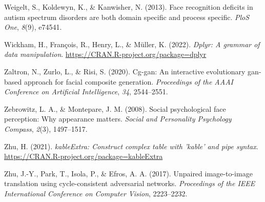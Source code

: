 \documentclass[
  doc,floatsintext]{apa6}
\newlength{\cslhangindent}
\newlength{\cslentryspacingunit} %
\newenvironment{CSLReferences}[2] %
 {%
  \setlength{\parindent}{0pt}
  \ifodd #1
  \let\oldpar\par
  \def\par{\hangindent=\cslhangindent\oldpar}
  \fi
  \setlength{\parskip}{#2\cslentryspacingunit}
 }%
 {}
\begin{document}
\begin{CSLReferences}{1}{0}
\leavevmode{}%
Weigelt, S., Koldewyn, K., \& Kanwisher, N. (2013). Face recognition deficits in autism spectrum disorders are both domain specific and process specific. \emph{PloS One}, \emph{8}(9), e74541.

\leavevmode{}%
Wickham, H., François, R., Henry, L., \& Müller, K. (2022). \emph{Dplyr: A grammar of data manipulation}. \url{https://CRAN.R-project.org/package=dplyr}

\leavevmode{}%
Zaltron, N., Zurlo, L., \& Risi, S. (2020). Cg-gan: An interactive evolutionary gan-based approach for facial composite generation. \emph{Proceedings of the AAAI Conference on Artificial Intelligence}, \emph{34}, 2544--2551.

\leavevmode{}%
Zebrowitz, L. A., \& Montepare, J. M. (2008). Social psychological face perception: Why appearance matters. \emph{Social and Personality Psychology Compass}, \emph{2}(3), 1497--1517.

\leavevmode{}%
Zhu, H. (2021). \emph{kableExtra: Construct complex table with 'kable' and pipe syntax}. \url{https://CRAN.R-project.org/package=kableExtra}

\leavevmode{}%
Zhu, J.-Y., Park, T., Isola, P., \& Efros, A. A. (2017). Unpaired image-to-image translation using cycle-consistent adversarial networks. \emph{Proceedings of the IEEE International Conference on Computer Vision}, 2223--2232.

\end{CSLReferences}

\endgroup
\end{document}
